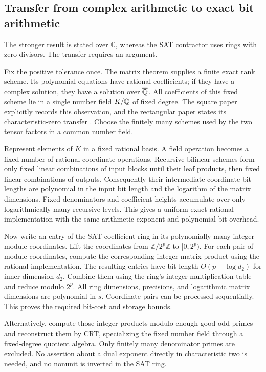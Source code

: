 \subsection{Transfer from complex arithmetic to exact bit arithmetic}

The stronger result is stated over $\mathbb C$, whereas the SAT contractor
uses rings with zero divisors. The transfer requires an argument.

Fix the positive tolerance once. The matrix theorem supplies a finite
exact rank scheme. Its polynomial equations have rational coefficients;
if they have a complex solution, they have a solution over
$\overline{\mathbb Q}$. All coefficients of this fixed scheme lie in a single
number field $K/\mathbb Q$ of fixed degree. The square paper explicitly records
this observation, and the rectangular paper states its
characteristic-zero transfer \cite{mmnew,mmrect}. Choose the finitely
many schemes used by the two tensor factors in a common number field.

Represent elements of $K$ in a fixed rational basis. A field operation
becomes a fixed number of rational-coordinate operations. Recursive
bilinear schemes form only fixed linear combinations of input blocks
until their leaf products, then fixed linear combinations of outputs.
Consequently their intermediate coordinate bit lengths are polynomial in
the input bit length and the logarithm of the matrix dimensions. Fixed
denominators and coefficient heights accumulate over only logarithmically
many recursive levels. This gives a uniform exact rational implementation
with the same arithmetic exponent and polynomial bit overhead.

Now write an entry of the SAT coefficient ring in its polynomially many
integer module coordinates. Lift the coordinates from $\mathbb Z/2^p\mathbb Z$
to $[0,2^p)$. For each pair of module coordinates, compute the corresponding
integer matrix product using the rational implementation. The resulting
entries have bit length $O(p+\log d_2)$ for inner dimension $d_2$.
Combine them using the ring's integer multiplication table and reduce
modulo $2^p$. All ring dimensions, precisions, and logarithmic matrix
dimensions are polynomial in $s$. Coordinate pairs can be processed
sequentially. This proves the required bit-cost and storage bounds.

Alternatively, compute those integer products modulo enough good odd
primes and reconstruct them by CRT, specializing the fixed number field
through a fixed-degree quotient algebra. Only finitely many denominator
primes are excluded. No assertion about a dual exponent directly in
characteristic two is needed, and no nonunit is inverted in the SAT ring.

